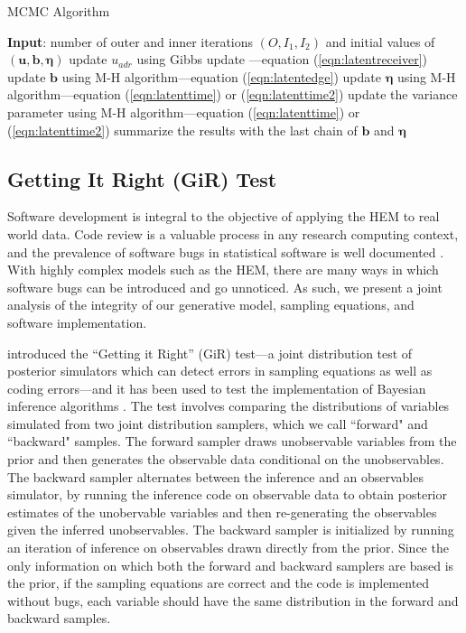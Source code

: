 \documentclass[ba]{imsart}
\def\spacingset#1{\renewcommand{\baselinestretch}%
	{#1}\small\normalsize} \spacingset{1}
\numberwithin{equation}{section}
\theoremstyle{plain}
\begin{document}
\begin{algorithm}[!t]
	\spacingset{1}
	\SetAlgoLined
	\caption{MCMC Algorithm}
	\begin{algorithmic}
	\STATE \textbf{Input}: number of outer and inner iterations $(O, I_1, I_2)$ and initial values of $(\boldsymbol{u}, \boldsymbol{b}, \boldsymbol{\eta})$
				\vskip 0.1in
					\STATE update $u_{adr}$ using Gibbs update ---equation (\ref{eqn:latentreceiver})
			\ENDFOR
		\ENDFOR
		\ENDFOR
			\STATE update $\boldsymbol{b}$ using M-H algorithm---equation (\ref{eqn:latentedge})
		\ENDFOR
			\STATE update $\boldsymbol{\eta}$ using M-H algorithm---equation (\ref{eqn:latenttime}) or (\ref{eqn:latenttime2}) 
		\ENDFOR
			\STATE update the variance parameter using M-H algorithm---equation (\ref{eqn:latenttime}) or (\ref{eqn:latenttime2}) 
				\ENDIF
	\ENDFOR
	\STATE	summarize the results with the last chain of $\boldsymbol{b}$ and $\boldsymbol{\eta}$
\end{algorithmic}
\label{alg:MCMC}
\end{algorithm}
\subsection{Getting It Right (GiR) Test} \label{subec:GiR}
  Software development is integral to the objective of applying the HEM to real world data. Code review is a valuable process in any research computing context, and the prevalence of software bugs in statistical software is well documented \citep[e.g., ][]{altman2004numerical,mccullough2009accuracy}.  With highly complex models such as the HEM, there are many ways in which software bugs can be introduced and go unnoticed. As such, we present a joint analysis of the integrity of our generative model, sampling equations, and software implementation. 
  
   \cite{geweke2004getting} introduced the ``Getting it Right'' (GiR) test---a joint distribution test of posterior simulators which can detect errors in sampling equations as well as coding errors---and it has been used to test the implementation of Bayesian inference algorithms \citep{zhao2016bayesian}.  The test involves comparing the distributions of variables simulated from two joint distribution samplers, which we call ``forward" and ``backward" samples. The forward sampler draws unobservable variables from the prior and then generates the observable data conditional on the unobservables. The backward sampler alternates between the inference and an observables simulator, by running the inference code on observable data to obtain posterior estimates of the unobervable variables and then re-generating the observables given the inferred unobservables. The backward sampler is initialized by running an iteration of inference on observables drawn directly from the prior. Since the only information on which both the forward and backward samplers are based is the prior, if the sampling equations are correct and the code is implemented without bugs, each variable should have the same distribution in the forward and backward samples.
   
\end{document}
